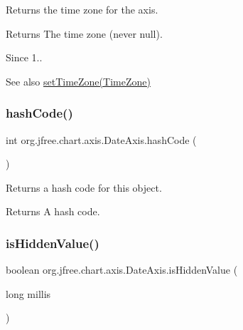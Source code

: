 Returns the time zone for the axis.

\begin{DoxyReturn}{Returns}
The time zone (never {\ttfamily null}).
\end{DoxyReturn}
\begin{DoxySince}{Since}
1..
\end{DoxySince}
\begin{DoxySeeAlso}{See also}
\mbox{\hyperlink{classorg_1_1jfree_1_1chart_1_1axis_1_1_date_axis_a135eb696e5b7b1ec0d5a2a85f857616a}{set\+Time\+Zone(\+Time\+Zone)}} 
\end{DoxySeeAlso}
\mbox{\label{classorg_1_1jfree_1_1chart_1_1axis_1_1_date_axis_afc9d0003678535ddcb88c63d0f4f094b}} 
\subsubsection{\texorpdfstring{hash\+Code()}{hashCode()}}
{\footnotesize\ttfamily int org.\+jfree.\+chart.\+axis.\+Date\+Axis.\+hash\+Code (\begin{DoxyParamCaption}{ }\end{DoxyParamCaption})}

Returns a hash code for this object.

\begin{DoxyReturn}{Returns}
A hash code. 
\end{DoxyReturn}
\mbox{\label{classorg_1_1jfree_1_1chart_1_1axis_1_1_date_axis_a067dca22e8cd47316e45584db54fd4a3}} 
\subsubsection{\texorpdfstring{is\+Hidden\+Value()}{isHiddenValue()}}
{\footnotesize\ttfamily boolean org.\+jfree.\+chart.\+axis.\+Date\+Axis.\+is\+Hidden\+Value (\begin{DoxyParamCaption}\item[{long}]{millis }\end{DoxyParamCaption})}

